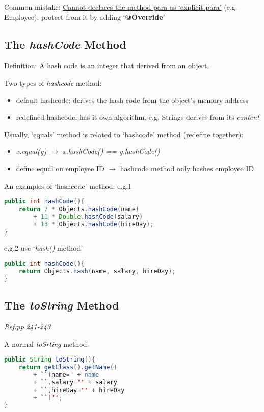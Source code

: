 \documentclass[12pt]{article}
\begin{document}
Common mistake: \underline{Cannot declares the method para as `explicit para'} (e.g. Employee).
protect from it by adding `\textbf{@Override}'

\subsection{The \emph{hashCode} Method}
\underline{Definition}: A hash code is an \underline{integer} that derived from an object.

Two types of \emph{hashcode} method:
\begin{itemize}
    \item default hashcode: derives the hash code from the object's \underline{memory address}
    \item redefined hashcode: has it own algorithm. e.g. Strings derives from its \emph{content}
\end{itemize}

Usually, `equals' method is related to `hashcode' method (redefine together):
\begin{itemize}
    \item \emph{x.equal(y) $\rightarrow$ x.hashCode() == y.hashCode()}
    \item define equal on employee ID $\rightarrow$ hashcode method only hashes employee ID
\end{itemize}

An examples of `hashcode' method:\newline
e.g.1
\begin{lstlisting}[language=Java]
public int hashCode(){
    return 7 * Objects.hashCode(name)
        + 11 * Double.hashCode(salary)
        + 13 * Objects.hashCode(hireDay);
}
\end{lstlisting} 

e.g.2 use `\emph{hash()} method'
\begin{lstlisting}[language=Java]
public int hashCode(){
    return Objects.hash(name, salary, hireDay);
}
\end{lstlisting}

\subsection{The \emph{toString} Method}
\emph{Ref:pp.241-243}

A normal \emph{toSrting} method:
\begin{lstlisting}[language=Java]
public String toString(){
    return getClass().getName()
        + ``[name=" + name
        + ``,salary='' + salary
        + ``,hireDay='' + hireDay
        + ``]'';
}
\end{lstlisting}
\end{document}
